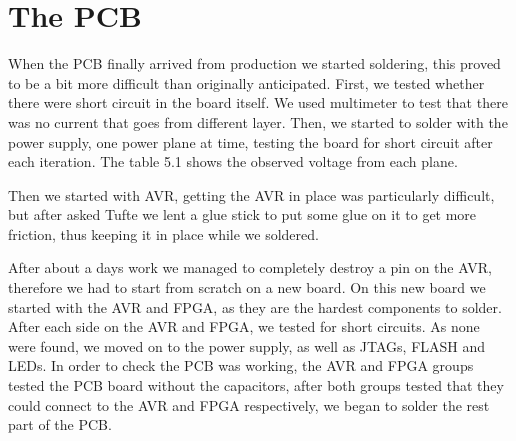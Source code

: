 \section {The PCB}



When the PCB finally arrived from production we started soldering, this proved
to be a bit more difficult than originally anticipated. First, we tested whether
there were short circuit in the board itself. We used multimeter to test that
there was no current that goes from different layer. Then, we started to solder
with the power supply, one power plane at time, testing the board for short
circuit after each iteration. The table  5.1 shows the observed voltage from each plane.



Then we started with AVR, getting the AVR in place was particularly difficult,
but after asked Tufte we lent a glue stick to put some glue on it to get more
friction, thus keeping it in place while we soldered.

After about a days work we managed to completely destroy a pin on the AVR,
therefore we had to start from scratch on a new board. On this new board we
started with the AVR and FPGA, as they are the hardest components to
solder. After each side on the AVR and FPGA, we tested for short circuits. As
none were found, we moved on to the power supply, as well as JTAGs, FLASH and
LEDs. In order to check the PCB was working, the AVR and FPGA groups tested the
PCB board without the capacitors, after both groups tested that they could
connect to the AVR and FPGA respectively, we began to solder the rest part of
the PCB.


